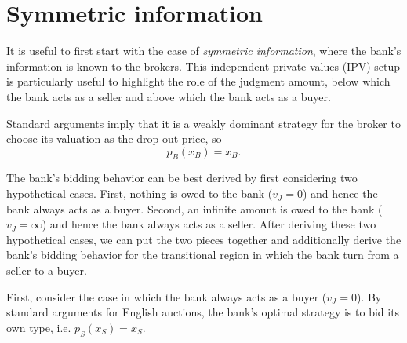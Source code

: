 \documentclass[11pt,twopage]{article}
\newtheorem{remark}{Remark}
{\bf}{\it}
\begin{document}
\section{Symmetric information}
\label{sec:indep-priv-valu}

It is useful to first start with the case of \emph{symmetric information}, where the bank's information is known to the brokers.  This independent private values (IPV) setup is particularly useful to highlight the role of
the judgment amount, below which the bank acts as a seller and above
which the bank acts as a buyer.

Standard arguments imply that it is a weakly dominant strategy for the broker to
choose its valuation as the drop out price, so 
\[p_B(x_B) = x_B.
\] 

The bank's bidding behavior can be best derived by first considering two hypothetical cases. First, nothing is owed to the bank ($v_J=0$) and hence the bank always acts as a buyer. Second, an infinite amount is owed to the bank ($v_J=\infty$) and hence the bank always acts as a seller. After deriving these two hypothetical cases, we can put the two pieces together and additionally derive the bank's bidding behavior for the transitional region in which the bank turn from a seller to a buyer.

First, consider the case in which the bank always acts as a buyer ($v_J=0$). By standard arguments for English auctions, the bank's optimal strategy is to bid its own type, i.e. $p_S(x_S)=x_S$.
\end{document}
